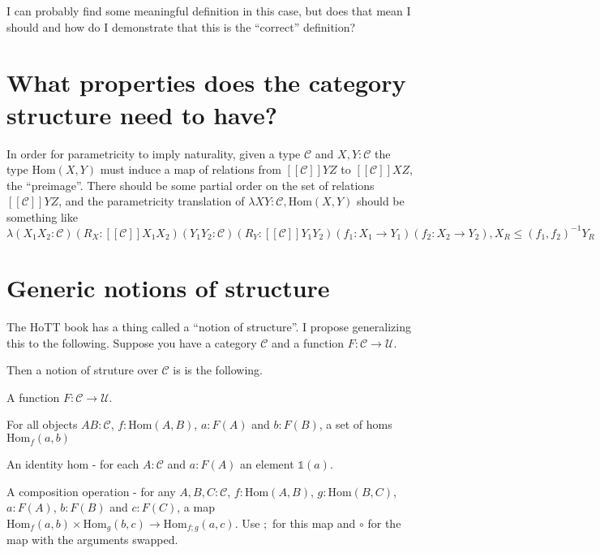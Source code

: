 \documentclass[12pt]{article} %
\theoremstyle{definition}
\theoremstyle{definition}
\theoremstyle{definition}
\theoremstyle{definition}
\begin{document}
I can probably find some meaningful definition in this case, but does that mean I should and how do
I demonstrate that this is the ``correct'' definition?



\section{What properties does the category structure need to have?}

In order for parametricity to imply naturality, given a type $\mathcal{C}$ and $X,Y:\mathcal{C}$
the type $\text{Hom}(X,Y)$ must induce a map of relations from $[[\mathcal{C}]] Y Z$ to
$[[\mathcal{C}]] X Z$, the ``preimage''. There should be some partial order on the set of relations
$[[\mathcal{C}]] Y Z$, and the parametricity translation of 
$\lambda X Y : \mathcal{C}, \text{Hom}(X, Y)$ should be something like
\begin{equation}
  \lambda (X_1 X_2 : \mathcal{C}) (R_X : [[\mathcal{C}]] X_1 X_2) (Y_1 Y_2 : \mathcal{C})
  (R_Y : [[\mathcal{C}]]Y_1 Y_2) (f_1 : X_1 \rightarrow Y_1) (f_2 : X_2 \rightarrow Y_2), 
  X_R \le (f_1, f_2)^{-1}Y_R
\end{equation}


\section{Generic notions of structure}

The HoTT book has a thing called a ``notion of structure''. I propose generalizing this to the following.
Suppose you have a category $\mathcal{C}$ and a function $F : \mathcal{C} \rightarrow \mathcal{U}$.

Then a notion of struture over $\mathcal{C}$ is is the following.

A function  $F : \mathcal{C} \rightarrow \mathcal{U}$.

For all objects $A B : \mathcal{C}$, $f : \text{Hom}(A, B)$, $a : F(A)$ and $b : F(B)$,
a set of homs $\text{Hom}_f(a, b)$

An identity hom - for each $A : \mathcal{C}$ and $a : F(A)$ an element $\mathbb{1}(a)$.

A composition operation - for any $A, B, C : \mathcal{C}$, $f : \text{Hom}(A, B)$, $g : \text{Hom}(B,C)$,
$a : F(A)$, $b : F(B)$ and $c : F(C)$, a map 
$\text{Hom}_f(a, b) \times \text{Hom}_g(b, c) \rightarrow \text{Hom}_{f ; g}(a, c)$. Use $;$ for this map and
$\circ$ for the map with the arguments swapped.
\end{document}
